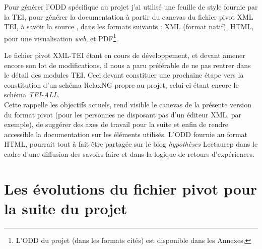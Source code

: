 Pour générer l'ODD spécifique au projet j'ai utilisé une feuille de style  fournie par la TEI, pour générer la documentation à partir du canevas du fichier pivot XML TEI, à savoir la source , dans les formats suivants : XML (format natif), HTML, pour une visualisation \textit{web}, et PDF\footnote{L'ODD du projet (dans les formats cités) est disponible dans les Annexes, }.

Le fichier pivot XML-TEI étant en cours de développement, et devant amener encore son lot de modifications, il nous a paru préférable de ne pas rentrer dans le détail des modules TEI. Ceci devant constituer une prochaine étape vers la constitution d'un schéma RelaxNG propre au projet, celui-ci étant encore le schéma \textit{TEI-ALL}.\\ 

Cette  rappelle les objectifs actuels, rend visible le canevas de la présente version du format pivot (pour les personnes ne disposant pas d'un éditeur XML, par exemple), de suggérer des axes de travail pour la suite et enfin de rendre accessible la documentation sur les éléments utilisés. L'ODD fournie au format HTML, pourrait tout à fait être partagée sur le blog \textit{hypothèses} Lectaurep dans le cadre d'une diffusion des savoirs-faire et dans la logique de retours d'expériences.

\section{Les évolutions du fichier pivot pour la suite du projet}


